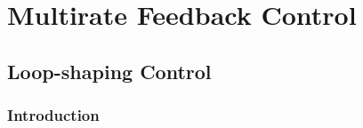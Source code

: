 \documentclass [11pt, proquest] {uwthesis}[2020/02/24]
\begin{document}



\part{Multirate Feedback Control} \label{part:Multirate-Feedback-Control}

 
\chapter{Loop-shaping Control} \label{chap:Loop-shaping-Control}

\section{Introduction}
\end{document}
